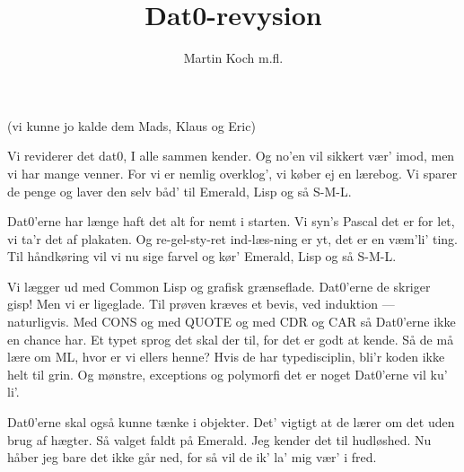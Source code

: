 \documentclass{article}
\title{Dat0-revysion}
\author{Martin Koch m.fl.}
\begin{document}
\maketitle

\begin{roles}
   (vi kunne jo kalde dem Mads, Klaus og Eric)
\end{roles}

\begin{song}
 Vi reviderer det dat0,
                I alle sammen kender.
 Og no'en vil sikkert vær' imod,
                men vi har mange venner.
 For vi er nemlig overklog',
                vi køber ej en lærebog.
    Vi sparer de penge og laver den selv
                båd' til Emerald, Lisp og så S-M-L.

 Dat0'erne har længe haft
                det alt for nemt i starten.
 Vi syn's Pascal det er for let,        
                vi ta'r det af plakaten.               
 Og re-gel-sty-ret ind-læs-ning           
                er yt, det er en væm'li' ting.         
    Til håndkøring vil vi nu sige farvel    
                og kør' Emerald, Lisp og så S-M-L.     
                                                       
 Vi lægger ud med Common Lisp             
                og grafisk grænseflade.                
                Dat0'erne de skriger gisp!             
                Men vi er ligeglade.                   
                Til prøven kræves et bevis,            
                ved induktion --- naturligvis.          
                Med CONS og med QUOTE og med CDR og CAR
                så Dat0'erne ikke en chance har.       
\pagebreak[4]
 Et typet sprog det skal der til,         
                for det er godt at kende.              
                Så de må lære om ML,                   
                hvor er vi ellers henne?               
                Hvis de har typedisciplin,             
                bli'r koden ikke helt til grin.        
                Og mønstre, exceptions og polymorfi    
                det er noget Dat0'erne vil ku' li'.        
                                                       
 Dat0'erne skal også kunne                
                tænke i objekter.                      
                Det' vigtigt at de lærer om det        
                uden brug af hægter.                   
                Så valget faldt på Emerald.            
                Jeg kender det til hudløshed.          
                Nu håber jeg bare det ikke går ned,    
                for så vil de ik' la' mig vær' i fred.


\end{song}
\end{document}
